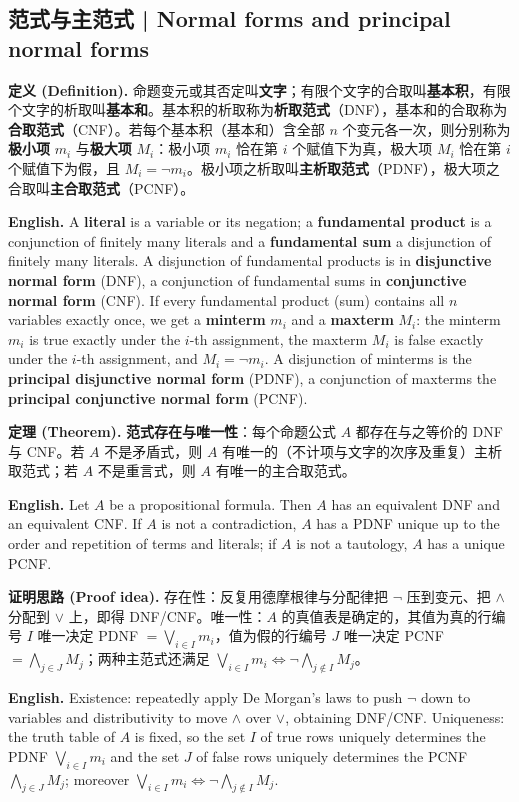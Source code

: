 \documentclass[UTF8,11pt,a4paper]{ctexart}
\newcommand{\EN}[1]{\par\noindent \textbf{English.} #1\par}
\newcommand{\DEF}[2]{\par\noindent\textbf{定义 (Definition).} #1\par\EN{#2}}
\newcommand{\THM}[2]{\par\noindent\textbf{定理 (Theorem).} #1\par\EN{#2}}
\newcommand{\PRF}[2]{\par\noindent\textbf{证明思路 (Proof idea).} #1\par\EN{#2}}
\begin{document}
\subsection{范式与主范式 | Normal forms and principal normal forms}
\DEF{命题变元或其否定叫\textbf{文字}；有限个文字的合取叫\textbf{基本积}，有限个文字的析取叫\textbf{基本和}。基本积的析取称为\textbf{析取范式}（DNF），基本和的合取称为\textbf{合取范式}（CNF）。若每个基本积（基本和）含全部 $n$ 个变元各一次，则分别称为\textbf{极小项} $m_i$ 与\textbf{极大项} $M_i$：极小项 $m_i$ 恰在第 $i$ 个赋值下为真，极大项 $M_i$ 恰在第 $i$ 个赋值下为假，且 $M_i=\neg m_i$。极小项之析取叫\textbf{主析取范式}（PDNF），极大项之合取叫\textbf{主合取范式}（PCNF）。}{A \textbf{literal} is a variable or its negation; a \textbf{fundamental product} is a conjunction of finitely many literals and a \textbf{fundamental sum} a disjunction of finitely many literals. A disjunction of fundamental products is in \textbf{disjunctive normal form} (DNF), a conjunction of fundamental sums in \textbf{conjunctive normal form} (CNF). If every fundamental product (sum) contains all $n$ variables exactly once, we get a \textbf{minterm} $m_i$ and a \textbf{maxterm} $M_i$: the minterm $m_i$ is true exactly under the $i$-th assignment, the maxterm $M_i$ is false exactly under the $i$-th assignment, and $M_i=\neg m_i$. A disjunction of minterms is the \textbf{principal disjunctive normal form} (PDNF), a conjunction of maxterms the \textbf{principal conjunctive normal form} (PCNF).}
\THM{\textbf{范式存在与唯一性}：每个命题公式 $A$ 都存在与之等价的 DNF 与 CNF。若 $A$ 不是矛盾式，则 $A$ 有唯一的（不计项与文字的次序及重复）主析取范式；若 $A$ 不是重言式，则 $A$ 有唯一的主合取范式。}{Let $A$ be a propositional formula. Then $A$ has an equivalent DNF and an equivalent CNF. If $A$ is not a contradiction, $A$ has a PDNF unique up to the order and repetition of terms and literals; if $A$ is not a tautology, $A$ has a unique PCNF.}
\PRF{存在性：反复用德摩根律与分配律把 $\neg$ 压到变元、把 $\wedge$ 分配到 $\vee$ 上，即得 DNF/CNF。唯一性：$A$ 的真值表是确定的，其值为真的行编号 $I$ 唯一决定 PDNF $=\bigvee_{i\in I}m_i$，值为假的行编号 $J$ 唯一决定 PCNF $=\bigwedge_{j\in J}M_j$；两种主范式还满足 $\bigvee_{i\in I}m_i\Leftrightarrow\neg\bigwedge_{j\notin I}M_j$。}{Existence: repeatedly apply De Morgan's laws to push $\neg$ down to variables and distributivity to move $\wedge$ over $\vee$, obtaining DNF/CNF. Uniqueness: the truth table of $A$ is fixed, so the set $I$ of true rows uniquely determines the PDNF $\bigvee_{i\in I}m_i$ and the set $J$ of false rows uniquely determines the PCNF $\bigwedge_{j\in J}M_j$; moreover $\bigvee_{i\in I}m_i\Leftrightarrow\neg\bigwedge_{j\notin I}M_j$.}
\end{document}
